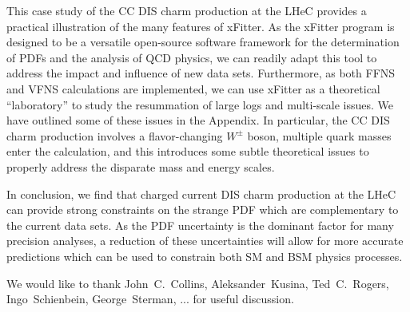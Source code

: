\documentclass[pdftex,twocolumn,epjc3]{svjour3}          %
\begin{document}
This case  study of the CC DIS charm production at the LHeC
provides a practical illustration of the many features of xFitter.
%
As the xFitter program is designed to be a versatile  open-source
software framework for the determination of PDFs and the analysis of
QCD physics, we can readily adapt this tool to address the impact and influence of
new data sets.
%
Furthermore, as both FFNS and VFNS calculations are implemented,
we can use xFitter as a theoretical ``laboratory'' to study the 
resummation of large logs and multi-scale issues.
%
We have outlined some of these issues in the Appendix. 
%
In particular, the CC DIS charm production involves a flavor-changing $W^\pm$ boson,
multiple quark masses enter the calculation, and this introduces some subtle theoretical
issues to properly address the disparate mass and energy scales.
%


In conclusion, we find that charged current DIS charm production at the LHeC can 
provide strong constraints on the strange PDF which are complementary to the current  data sets.
%
As the PDF uncertainty is the dominant factor for many precision analyses,
a reduction of these uncertainties will allow for more accurate predictions
which can be used to constrain both SM and BSM physics processes. 




\begin{acknowledgements}

We would like to thank
John~C.~Collins,
Aleksander~Kusina,
Ted~C.~Rogers,
Ingo~Schienbein,
George~Sterman,
...
for useful discussion.

\end{acknowledgements}







\end{document}
